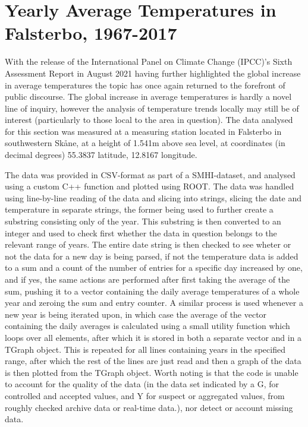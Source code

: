 
\section{Yearly Average Temperatures in Falsterbo, 1967-2017}
With the release of the International Panel on Climate Change (IPCC)'s Sixth Assessment Report\cite{IPCC} in August 2021 having further highlighted the global increase in average temperatures the topic has once again returned to the forefront of public discourse. The global increase in average temperatures is hardly a novel line of inquiry, however the analysis of temperature trends locally may still be of interest (particularly to those local to the area in question). The data analysed for this section was measured at a measuring station located in Falsterbo in southwestern Skåne, at a height of 1.541m above sea level, at coordinates (in decimal degrees) 55.3837 latitude, 12.8167 longitude.


The data was provided in CSV-format as part of a SMHI-dataset, and analysed using a custom C++ function and plotted using ROOT. The data was handled using line-by-line reading of the data and slicing into strings, slicing the date and temperature in separate strings, the former being used to further create a substring consisting only of the year. This substring is then converted to an integer and used to check first whether the data in question belongs to the relevant range of years. The entire date string is then checked to see wheter or not the data for a new day is being parsed, if not the temperature data is added to a sum and a count of the number of entries for a specific day increased by one, and if yes, the same actions are performed after first taking the average of the sum, pushing it to a vector containing the daily average temperatures of a whole year and zeroing the sum and entry counter. A similar process is used whenever a new year is being iterated upon, in which case the average of the vector containing the daily averages is calculated using a small utility function which loops over all elements, after which it is stored in both a separate vector and in a TGraph object. This is repeated for all lines containing years in the specified range, after which the rest of the lines are just read and then a graph of the data is then plotted from the TGraph object. Worth noting is that the code is unable to account for the quality of the data (in the data set indicated by a G, for controlled and accepted values, and Y for suspect or aggregated values, from roughly checked archive data or real-time data.), nor detect or account missing data.

